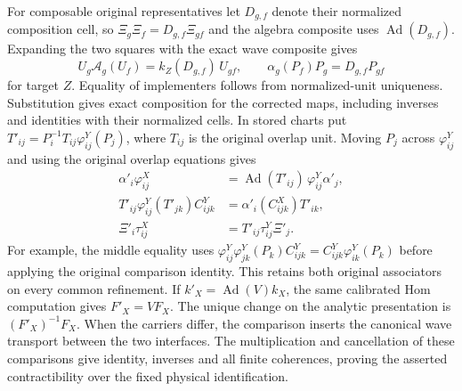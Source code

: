\documentclass[
  english,
  11pt,
  reqno]{amsart}
\begin{document}
For composable original representatives let \(D_{g,f}\) denote their
normalized composition cell, so \(\Xi_g\Xi_f=D_{g,f}\Xi_{gf}\) and the
algebra composite uses \(\operatorname{Ad}(D_{g,f})\). Expanding the two
squares with the exact wave composite gives%
 \[
U_g\mathcal A_g(U_f)=k_Z(D_{g,f})\,U_{gf},\qquad
\alpha_g(P_f)P_g=D_{g,f}P_{gf}
\] for target \(Z\). Equality of implementers follows from
normalized-unit uniqueness. Substitution gives exact composition for the
corrected maps, including inverses and identities with their normalized
cells. In stored charts put
\(T'_{ij}=P_i^{-1}T_{ij}\varphi^Y_{ij}(P_j)\), where \(T_{ij}\) is the
original overlap unit. Moving \(P_j\) across \(\varphi_{ij}^Y\) and
using the original overlap equations gives%
 \[
\begin{aligned}
\alpha'_i\varphi^X_{ij}
 &=\operatorname{Ad}(T'_{ij})\,\varphi^Y_{ij}\alpha'_j,\\
T'_{ij}\varphi^Y_{ij}(T'_{jk})C^Y_{ijk}
 &=\alpha'_i(C^X_{ijk})T'_{ik},\\
\Xi'_i\tau^X_{ij}&=T'_{ij}\tau^Y_{ij}\Xi'_j .
\end{aligned}
\] For example, the middle equality uses
\(\varphi^Y_{ij}\varphi^Y_{jk}(P_k)C^Y_{ijk}=C^Y_{ijk}\varphi^Y_{ik}(P_k)\)
before applying the original comparison identity. This retains both
original associators on every common refinement. If
\(k'_X=\operatorname{Ad}(V)k_X\), the same calibrated Hom computation
gives \(F'_X=VF_X\). The unique change on the analytic presentation is
\((F'_X)^{-1}F_X\). When the carriers differ, the comparison inserts the
canonical wave transport between the two interfaces. The multiplication
and cancellation of these comparisons give identity, inverses and all
finite coherences, proving the asserted contractibility over the fixed
physical identification.
\end{document}
